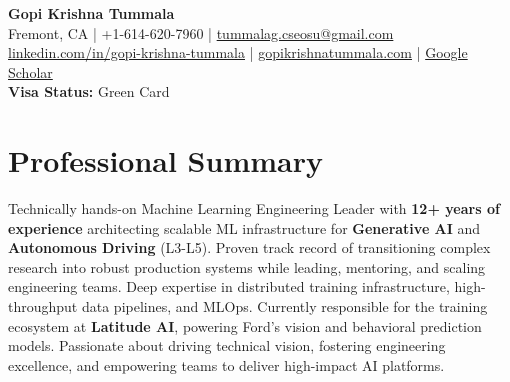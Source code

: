 \documentclass[10pt,letterpaper]{article}
\begin{document}
\begin{center}
    {\Huge \textbf{Gopi Krishna Tummala}} \\ [6pt]
    \large
    \faMapMarker* Fremont, CA \quad | \quad
    \faPhone* +1-614-620-7960 \quad | \quad
    \faEnvelope \href{mailto:tummalag.cseosu@gmail.com}{tummalag.cseosu@gmail.com} \\ [4pt]
    \small
    \faLinkedin \href{https://www.linkedin.com/in/gopi-krishna-tummala-00294415/}{ linkedin.com/in/gopi-krishna-tummala} \quad | \quad
    \faGlobe \href{https://gopikrishnatummala.com/}{ gopikrishnatummala.com} \quad | \quad
    \faGraduationCap \href{https://scholar.google.com/citations?user=SaKqqO8AAAAJ&hl=en}{ Google Scholar} \\ [4pt]
    \textbf{Visa Status:} Green Card
\end{center}

\section{Professional Summary}
Technically hands-on Machine Learning Engineering Leader with \textbf{12+ years of experience} architecting scalable ML infrastructure for \textbf{Generative AI} and \textbf{Autonomous Driving} (L3-L5). Proven track record of transitioning complex research into robust production systems while leading, mentoring, and scaling engineering teams. Deep expertise in distributed training infrastructure, high-throughput data pipelines, and MLOps. Currently responsible for the training ecosystem at \textbf{Latitude AI}, powering Ford's vision and behavioral prediction models. Passionate about driving technical vision, fostering engineering excellence, and empowering teams to deliver high-impact AI platforms.

\end{document}
